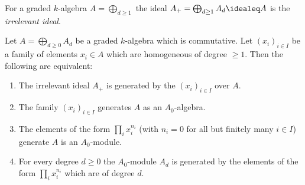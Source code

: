 \begin{definition}
  For a graded $k$-algebra $A = \bigoplus_{d \geq 1}$ the ideal $A_+ = \bigoplus_{d \geq 1} A_d \idealeq A$ is the \emph{irrelevant ideal}.
\end{definition}


\begin{proposition}
  \label{proposition: homeneous generators for irrelevant ideal}
  Let $A = \bigoplus_{d \geq 0} A_d$ be a graded $k$-algebra which is commutative.
  Let $(x_i)_{i \in I}$ be a family of elements $x_i \in A$ which are homogeneous of degree $\geq 1$.
  Then the following are equivalent:
  \begin{enumerate}
    \item
      The irrelevant ideal $A_+$ is generated by the $(x_i)_{i \in I}$ over $A$.
    \item
      The family $(x_i)_{i \in I}$ generates $A$ as an $A_0$-algebra.
    \item
      The elements of the form $\prod_i x_i^{n_i}$ (with $n_i = 0$ for all but finitely many $i \in I$) generate $A$ is an $A_0$-module.
    \item
      For every degree $d \geq 0$ the $A_0$-module $A_d$ is generated by the elements of the form $\prod_i x_i^{n_i}$ which are of degree $d$.
  \end{enumerate}
\end{proposition}


